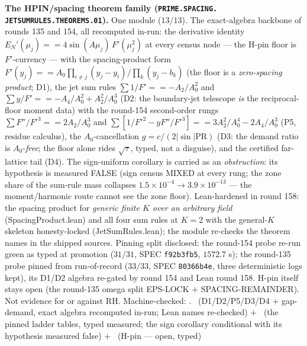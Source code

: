 \par\smallskip\noindent\textbf{The HPIN/spacing theorem family
(\texttt{PRIME.\allowbreak SPACING.\allowbreak
JETSUMRULES.\allowbreak THEOREMS.01}).}
One module ($13/13$).  The exact-algebra backbone of rounds 135
and 154, all recomputed in-run: the derivative identity
$E_N'(\mu_j) == 4\sin(A\mu_j)\,F'(\mu_j^2)$ at every census node
--- the H-pin floor is $F'$-currency --- with the
spacing-product form $F'(y_j) == A_0 \prod_{i \ne j}(y_j -
y_i)/\prod_k(y_j - b_k)$ (the floor is a \emph{zero-spacing
product}; D1), the jet sum rules $\sum 1/F' == -A_2/A_0^2$ and
$\sum y/F' == -A_4/A_0^2 + A_2^2/A_0^3$ (D2: the boundary-jet
telescope \emph{is} the reciprocal-floor moment data) with the
round-154 second-order rungs $\sum F''/F'^3 == 2A_2/A_0^3$ and
$\sum [1/F'^2 - y F''/F'^3] == 3A_2^2/A_0^4 - 2A_4/A_0^3$ (P5,
residue calculus), the $A_0$-cancellation $g = c/(2|\sin|
\mathrm{PR})$ (D3: the demand ratio is $A_0$-\emph{free}; the
floor alone rides $\sqrt{\tau}$, typed, not a disguise), and the
certified far-lattice tail (D4).  The sign-uniform corollary is
carried as an \emph{obstruction}: its hypothesis is measured
FALSE (sign census MIXED at every rung; the zone share of the
sum-rule mass collapses $1.5\times10^{-4} \to
3.9\times10^{-13}$ --- the moment/harmonic route cannot see the
zone floor).  Lean-hardened in round 158: the spacing product
for \emph{generic finite $K$ over an arbitrary field}
(SpacingProduct.lean) and all four sum rules at $K = 2$ with the
general-$K$ skeleton honesty-locked (JetSumRules.lean); the
module re-checks the theorem names in the shipped sources.
Pinning split disclosed: the round-154 probe re-run green as
typed at promotion ($31/31$, SPEC \texttt{f92b3fb5}, $1572.7$
s); the round-135 probe pinned from run-of-record ($33/33$,
SPEC \texttt{80366b4e}, three deterministic logs kept), its
D1/D2 algebra re-gated by round 154 and Lean round 158.  H-pin
itself stays open (the round-135 omega split EPS-LOCK $+$
SPACING-REMAINDER).  Not evidence for or against RH.
Machine-checked: .
\mE\ (D1/D2/P5/D3/D4 $+$ gap-demand, exact algebra recomputed
in-run; Lean names re-checked) $+$ \mC\ (the pinned ladder
tables, typed measured; the sign corollary conditional with its
hypothesis measured false) $+$ \mO\ (H-pin --- open, typed)
\par\smallskip


